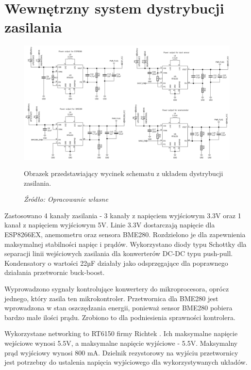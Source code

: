 \documentclass[12pt,a4paper,oneside]{memoir}
\begin{document}
\section{Wewnętrzny system dystrybucji zasilania}
\begin{figure}[!h]
	\centering
	\includegraphics[scale=0.15]{images/sch/sch-07.png}
	{\tytulyrozdzialow \footnotesize \caption[Schemat - układ dystrybucji zasilania] {Obrazek przedstawiający wycinek schematu z układem dystrybucji zasilania.}}
	\caption*{\textit{Źródło: Opracowanie własne}}
\end{figure}
\par Zastosowano 4 kanały zasilania - 3 kanały z napięciem wyjściowym 3.3V oraz 1 kanał z napięciem wyjściowym 5V. Linie 3.3V dostarczają napięcie dla ESP8266EX, anemometru oraz sensora BME280. Rozdzielono je dla zapewnienia maksymalnej stabilności napięc i prądów. Wykorzystano diody typu Schottky dla separacji linii wejściowych zasilania dla konwerterów DC-DC typu push-pull. Kondensatory o wartości 22µF działały jako odsprzęgające dla poprawnego działania przetwornic buck-boost. 
\par Wyprowadzono sygnały kontrolujące konwertery do mikroprocesora, oprócz jednego, który zasila ten mikrokontroler. Przetwornica dla BME280 jest wprowadzona w stan oszczędzania energii, ponieważ sensor BME280 pobiera bardzo małe ilości prądu. Zrobiono to dla podniesienia sprawności kontrolera. 
\par Wykorzystane networking to RT6150 firmy Richtek \cite{rt6150}. Ich maksymalne napięcie wejściowe wynosi 5.5V, a maksymalne napięcie wyjściowe - 5.5V. Maksymalny prąd wyjściowy wynosi 800 mA. Dzielnik rezystorowy na wyjściu przetwornicy jest potrzebny do ustalenia napięcia wyjściowego dla wykorzystywanych układów.
\newpage
\end{document}

